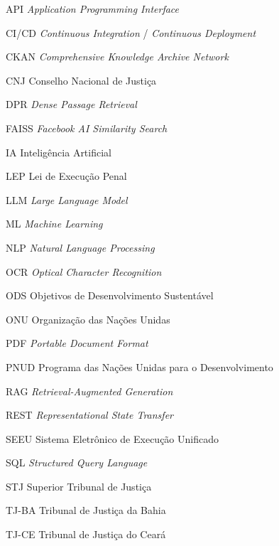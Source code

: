 \begin{siglas}
  \item[API] \textit{Application Programming Interface}
  \item[CI/CD] \textit{Continuous Integration} / \textit{Continuous Deployment}
  \item[CKAN] \textit{Comprehensive Knowledge Archive Network}
  \item[CNJ] Conselho Nacional de Justiça
  \item[DPR] \textit{Dense Passage Retrieval}
  \item[FAISS] \textit{Facebook AI Similarity Search}
  \item[IA] Inteligência Artificial
  \item[LEP] Lei de Execução Penal
  \item[LLM] \textit{Large Language Model}
  \item[ML] \textit{Machine Learning}
  \item[NLP] \textit{Natural Language Processing}
  \item[OCR] \textit{Optical Character Recognition}
  \item[ODS] Objetivos de Desenvolvimento Sustentável
  \item[ONU] Organização das Nações Unidas
  \item[PDF] \textit{Portable Document Format}
  \item[PNUD] Programa das Nações Unidas para o Desenvolvimento
  \item[RAG] \textit{Retrieval-Augmented Generation}
  \item[REST] \textit{Representational State Transfer}
  \item[SEEU] Sistema Eletrônico de Execução Unificado
  \item[SQL] \textit{Structured Query Language}
  \item[STJ] Superior Tribunal de Justiça
  \item[TJ-BA] Tribunal de Justiça da Bahia
  \item[TJ-CE] Tribunal de Justiça do Ceará
\end{siglas}
